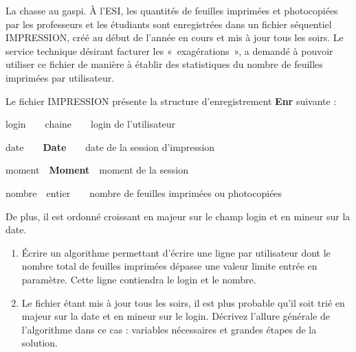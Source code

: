 \begin{Exercice}{La chasse au gaspi.}
	À l’ESI, les quantités de feuilles imprimées et photocopiées par les
	professeurs et les étudiants sont enregistrées dans un fichier
	séquentiel IMPRESSION, créé au début de l’année en cours et mis à jour
	tous les soirs. Le service technique désirant facturer les
	«~exagérations~», a demandé à pouvoir utiliser ce fichier de manière à
	établir des statistiques du nombre de feuilles imprimées par
	utilisateur.

	Le fichier IMPRESSION présente la structure d’enregistrement
	\textbf{Enr} suivante :

	{	login\ \ \ \ chaine\ \ \ \ login de l’utilisateur}

	{	date\ \ \ \ \textbf{Date}\ \ \ \ date de la session d’impression }

	{	moment\ \ \textbf{Moment}\ \ moment de la session}

	{	nombre\ \ entier\ \ \ \ nombre de feuilles imprimées ou photocopiées}

	De plus, il est ordonné croissant en majeur sur le champ login et en
	mineur sur la date. 

	\begin{enumerate}[label=\alph*)]
		\item 
			Écrire un algorithme permettant d'écrire une ligne par
			utilisateur dont le nombre total de feuilles imprimées dépasse une
			valeur limite entrée en paramètre. Cette ligne contiendra le login et
			le nombre.
		\item 
			Le fichier étant mis à jour tous les soirs, il est plus probable
			qu'il soit trié en majeur sur la date et en mineur sur
			le login. Décrivez l'allure générale de
			l'algorithme dans ce cas : variables nécessaires et
			grandes étapes de la solution.
	\end{enumerate}
\end{Exercice}
	
